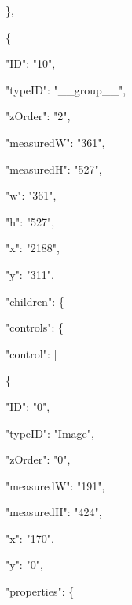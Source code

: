 \documentclass[13pt]{article}
\begin{document}
{\raggedright
{\footnotesize                 \},}
}

{\raggedright
{\footnotesize                 \{}
}

{\raggedright
{\footnotesize                     "ID": "10",}
}

{\raggedright
{\footnotesize                     "typeID": "\_\_group\_\_",}
}

{\raggedright
{\footnotesize                     "zOrder": "2",}
}

{\raggedright
{\footnotesize                     "measuredW": "361",}
}

{\raggedright
{\footnotesize                     "measuredH": "527",}
}

{\raggedright
{\footnotesize                     "w": "361",}
}

{\raggedright
{\footnotesize                     "h": "527",}
}

{\raggedright
{\footnotesize                     "x": "2188",}
}

{\raggedright
{\footnotesize                     "y": "311",}
}

{\raggedright
{\footnotesize                     "children": \{}
}

{\raggedright
{\footnotesize                         "controls": \{}
}

{\raggedright
{\footnotesize                             "control": [}
}

{\raggedright
{\footnotesize                                 \{}
}

{\raggedright
{\footnotesize                                     "ID": "0",}
}

{\raggedright
{\footnotesize                                     "typeID": "Image",}
}

{\raggedright
{\footnotesize                                     "zOrder": "0",}
}

{\raggedright
{\footnotesize                                     "measuredW": "191",}
}

{\raggedright
{\footnotesize                                     "measuredH": "424",}
}

{\raggedright
{\footnotesize                                     "x": "170",}
}

{\raggedright
{\footnotesize                                     "y": "0",}
}

{\raggedright
{\footnotesize                                     "properties": \{}
}
\end{document}

